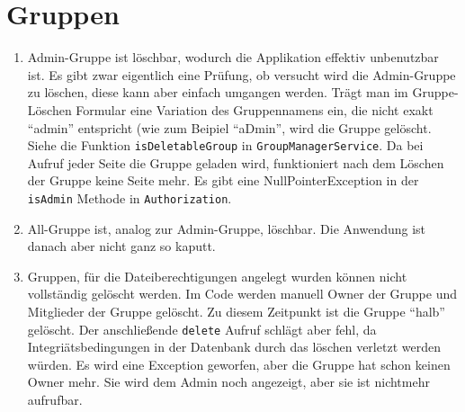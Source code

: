 \documentclass[12pt,DIV14,BCOR10mm,a4paper,parskip=half-,headsepline,headinclude,english,ngerman,bibliography=totocnumbered]{scrreprt}
\begin{document}
\section{Gruppen}
\begin{enumerate}
\item Admin-Gruppe ist löschbar, wodurch die Applikation effektiv unbenutzbar ist. Es gibt zwar eigentlich eine Prüfung, ob versucht wird die Admin-Gruppe zu löschen, diese kann aber einfach umgangen werden. Trägt man im Gruppe-Löschen Formular eine Variation des Gruppennamens ein, die nicht exakt \enquote{admin} entspricht (wie zum Beipiel \enquote{aDmin}, wird die Gruppe gelöscht. Siehe die Funktion \texttt{isDeletableGroup} in \texttt{GroupManagerService}. Da bei Aufruf jeder Seite die Gruppe geladen wird, funktioniert nach dem Löschen der Gruppe keine Seite mehr. Es gibt eine NullPointerException in der \texttt{isAdmin} Methode in \texttt{Authorization}.
\item All-Gruppe ist, analog zur Admin-Gruppe, löschbar. Die Anwendung ist danach aber nicht ganz so kaputt.
\item Gruppen, für die Dateiberechtigungen angelegt wurden können nicht vollständig gelöscht werden. Im Code werden manuell Owner der Gruppe und Mitglieder der Gruppe gelöscht. Zu diesem Zeitpunkt ist die Gruppe \enquote{halb} gelöscht. Der anschließende \texttt{delete} Aufruf schlägt aber fehl, da Integriätsbedingungen in der Datenbank durch das löschen verletzt werden würden. Es wird eine Exception geworfen, aber die Gruppe hat schon keinen Owner mehr. Sie wird dem Admin noch angezeigt, aber sie ist nichtmehr aufrufbar.
\end{enumerate}
\end{document}
